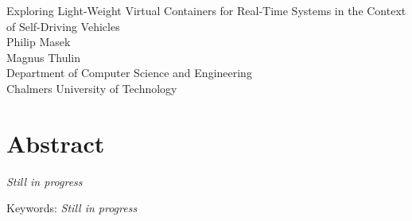 Exploring Light-Weight Virtual Containers for Real-Time Systems in the Context of Self-Driving Vehicles\\
Philip Masek\\
Magnus Thulin\\
Department of Computer Science and Engineering\\
Chalmers University of Technology \setlength{\parskip}{0.5cm}

\thispagestyle{plain}			%
\setlength{\parskip}{0pt plus 1.0pt}
\section*{Abstract}
\textit{Still in progress}

\vfill
Keywords: \textit{Still in progress}

\newpage				%
\thispagestyle{empty}
\mbox{}